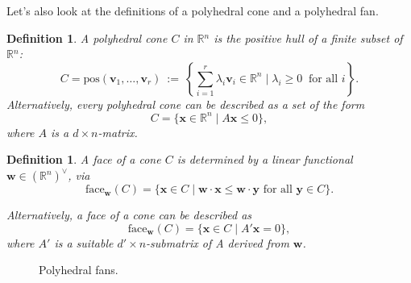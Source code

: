 \documentclass[11pt,reqno,a4paper]{article}
\theoremstyle{theoremstyle}
\theoremstyle{examplestyle}
\newtheorem{definition}[theorem]{Definition}
\theoremstyle{algorithmstyle}
\numberwithin{equation}{subsection}
\newcommand{\RR}{\mathbb{R}}
\begin{document}
Let's also look at the definitions of a polyhedral cone and a polyhedral fan.

\begin{definition}
    A \textit{polyhedral cone} $C$ in \( \mathbb{R} \)$^n$ is the positive hull of a finite subset of \( \mathbb{R} \)$^n$:
    \[ C = \text{pos}(\mathbf{v}_1, \ldots , \mathbf{v}_r) \: := \: \left\{ \sum_{i=1}^r \lambda_i \mathbf{{v}}_i \in \mathbb{R}^n \; | \; \lambda_i \geq 0 \: \text{ for all } i  \right \}.\] Alternatively, every \textit{polyhedral cone} can be described as a set of the form \[C = \{\mathbf{x}\in\RR^n \; | \; A\mathbf{x}\leq0\},\] where $A$ is a $d\times n$-matrix.

\end{definition}

\begin{definition}
    A face of a cone $C$ is determined by a linear functional $\mathbf{w} \in (\RR^n)^\vee$, via 
    \[\text{face}_\mathbf{w}(C) = \{\mathbf{x}\in C \; | \;\mathbf{w}\cdot\mathbf{x} \leq \mathbf{w} \cdot \mathbf{y} \text{ for all } \mathbf{y} \in C \}. \]
    
    Alternatively, a face of a cone can be described as \[\text{face}_\mathbf{w}(C) = \{\mathbf{x}\in C \; | \; A'\mathbf{x} = 0\},\] where $A'$ is a suitable $d'\times n$-submatrix of A derived from $\mathbf{w}$.
\end{definition}

\begin{figure}[h]
    \centering
    \caption{Polyhedral fans.}
    \label{fig:Polyfan}
\end{figure}
\end{document}
